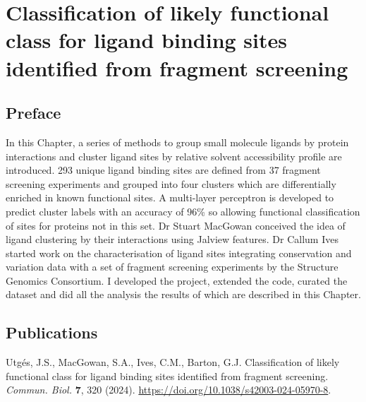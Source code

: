 \chapter{Classification of likely functional class for ligand binding sites identified from fragment screening}
\label{chap:FRAGSYS}

\section*{Preface}

In this Chapter, a series of methods to group small molecule ligands by protein interactions and cluster ligand sites by relative solvent accessibility profile are introduced. 293 unique ligand binding sites are defined from 37 fragment screening experiments and grouped into four clusters which are differentially enriched in known functional sites. A multi-layer perceptron is developed to predict cluster labels with an accuracy of 96\% so allowing functional classification of sites for proteins not in this set. Dr Stuart MacGowan conceived the idea of ligand clustering by their interactions using Jalview features. Dr Callum Ives started work on the characterisation of ligand sites integrating conservation and variation data with a set of fragment screening experiments by the Structure Genomics Consortium. I developed the project, extended the code, curated the dataset and did all the analysis the results of which are described in this Chapter.

\section*{Publications}

Utgés, J.S., MacGowan, S.A., Ives, C.M., Barton, G.J. Classification of likely functional class for ligand binding sites identified from fragment screening. \textit{Commun. Biol.} \textbf{7}, 320 (2024). \url{https://doi.org/10.1038/s42003-024-05970-8}.



